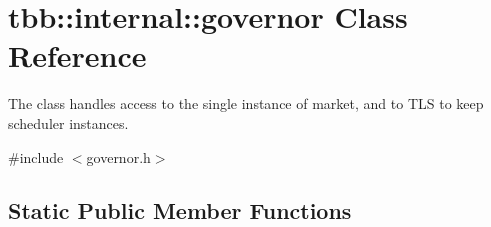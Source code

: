 \hypertarget{classtbb_1_1internal_1_1governor}{}\section{tbb\+:\+:internal\+:\+:governor Class Reference}
\label{classtbb_1_1internal_1_1governor}


The class handles access to the single instance of market, and to T\+L\+S to keep scheduler instances.  




{\ttfamily \#include $<$governor.\+h$>$}

\subsection*{Static Public Member Functions}

